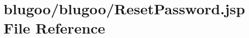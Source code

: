 \hypertarget{ResetPassword_8jsp}{
\section{blugoo/blugoo/ResetPassword.jsp File Reference}
\label{ResetPassword_8jsp}
}


